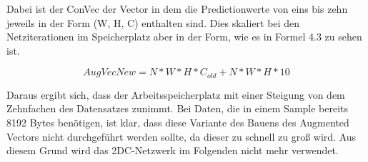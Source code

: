 Dabei ist der ConVec der Vector in dem die Predictionwerte von eins bis zehn jeweils in der Form (W, H, C) enthalten sind. Dies skaliert bei 
den Netziterationen im Speicherplatz aber in der Form, wie es in Formel 4.3 zu sehen ist.  

\begin{equation}
    AugVecNew = N*W*H*C_{old} + N*W*H*10
\end{equation}

Daraus ergibt sich, dass der Arbeitsspeicherplatz mit einer Steigung von dem Zehnfachen des Datensatzes zunimmt. Bei Daten, die in einem Sample 
bereits 8192 Bytes benötigen, ist klar, dass diese Variante des Bauens des Augmented Vectors nicht durchgeführt werden sollte, da dieser zu 
schnell zu groß wird. Aus diesem Grund wird das 2DC-Netzwerk im Folgenden nicht mehr verwendet. 

